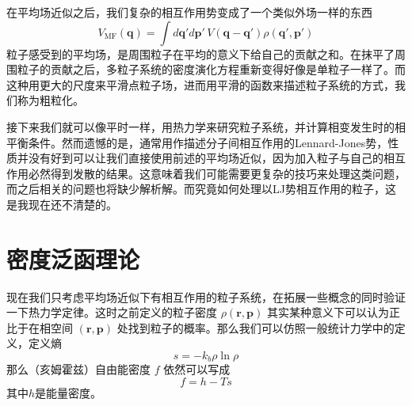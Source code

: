 \documentclass{ctexart}
\begin{document}
在平均场近似之后，我们复杂的相互作用势变成了一个类似外场一样的东西
\begin{equation}
V_{\mathrm{MF}}(\bm{q})=\int d\bm{q}'d\bm{p}'\,V(\bm{q}-\bm{q'})\rho(\bm{q}',\bm{p'})
\end{equation}
粒子感受到的平均场，是周围粒子在平均的意义下给自己的贡献之和。在抹平了周围粒子的贡献之后，多粒子系统的密度演化方程重新变得好像是单粒子一样了。而这种用更大的尺度来平滑点粒子场，进而用平滑的函数来描述粒子系统的方式，我们称为粗粒化。

接下来我们就可以像平时一样，用热力学来研究粒子系统，并计算相变发生时的相平衡条件。然而遗憾的是，通常用作描述分子间相互作用的Lennard-Jones势，性质并没有好到可以让我们直接使用前述的平均场近似，因为加入粒子与自己的相互作用必然得到发散的结果。这意味着我们可能需要更复杂的技巧来处理这类问题，而之后相关的问题也将缺少解析解。而究竟如何处理以LJ势相互作用的粒子，这是我现在还不清楚的。

\section{密度泛函理论}

现在我们只考虑平均场近似下有相互作用的粒子系统，在拓展一些概念的同时验证一下热力学定律。这时之前定义的粒子密度 $\rho(\bm{r},\bm{p})$ 其实某种意义下可以认为正比于在相空间 $(\bm{r},\bm{p})$ 处找到粒子的概率。那么我们可以仿照一般统计力学中的定义，定义熵
\begin{equation}
s=-k_b\rho\ln\rho
\end{equation}
那么（亥姆霍兹）自由能密度 $f$ 依然可以写成
\begin{equation}
f=h-Ts
\end{equation}
其中$h$是能量密度。
\end{document}
